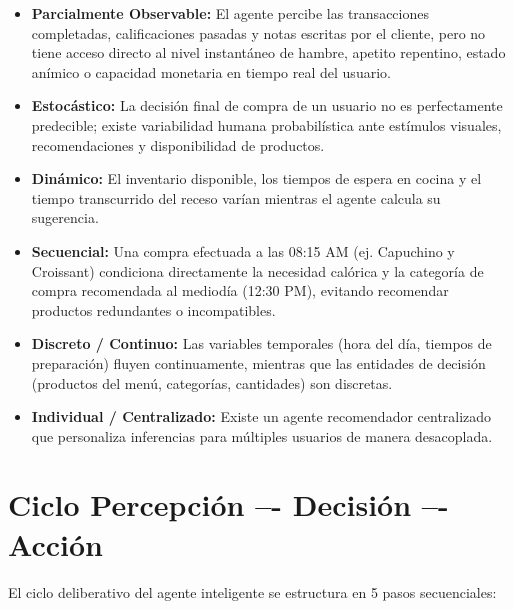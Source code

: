 \documentclass{article}
\begin{document}
\begin{itemize}
    \item \textbf{Parcialmente Observable:} El agente percibe las transacciones completadas, calificaciones pasadas y notas escritas por el cliente, pero no tiene acceso directo al nivel instantáneo de hambre, apetito repentino, estado anímico o capacidad monetaria en tiempo real del usuario.
    \item \textbf{Estocástico:} La decisión final de compra de un usuario no es perfectamente predecible; existe variabilidad humana probabilística ante estímulos visuales, recomendaciones y disponibilidad de productos.
    \item \textbf{Dinámico:} El inventario disponible, los tiempos de espera en cocina y el tiempo transcurrido del receso varían mientras el agente calcula su sugerencia.
    \item \textbf{Secuencial:} Una compra efectuada a las 08:15 AM (ej. Capuchino y Croissant) condiciona directamente la necesidad calórica y la categoría de compra recomendada al mediodía (12:30 PM), evitando recomendar productos redundantes o incompatibles.
    \item \textbf{Discreto / Continuo:} Las variables temporales (hora del día, tiempos de preparación) fluyen continuamente, mientras que las entidades de decisión (productos del menú, categorías, cantidades) son discretas.
    \item \textbf{Individual / Centralizado:} Existe un agente recomendador centralizado que personaliza inferencias para múltiples usuarios de manera desacoplada.
\end{itemize}

\section{Ciclo Percepción –- Decisión –- Acción}

El ciclo deliberativo del agente inteligente se estructura en 5 pasos secuenciales:
\end{document}
